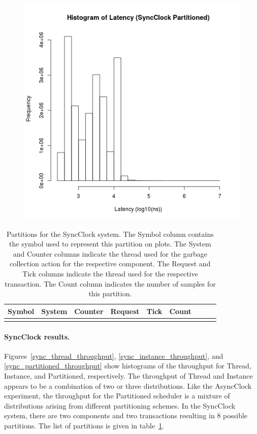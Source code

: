 \begin{figure}
\center
\includegraphics[height=.25\textheight]{sync_partitioned_latency_hist.png}
\caption{\label{sync_partitioned_latency}}
\end{figure}

\clearpage

\begin{longtable}{ccccccccr}
Symbol & System & Counter & Request & Tick & Count \\
\hline
\endhead

\caption{Partitions for the SyncClock system.  The Symbol column contains the symbol used to represent this partition on plots.  The System and Counter columns indicate the thread used for the garbage collection action for the respective component.  The Request and Tick columns indicate the thread used for the respective transaction.  The Count column indicates the number of samples for this partition.}
\label{sync_partitions}
\end{longtable}

\paragraph{SyncClock results.}
Figures~\ref{sync_thread_throughput}, \ref{sync_instance_throughput}, and \ref{sync_partitioned_throughput} show histograms of the throughput for Thread, Instance, and Partitioned, respectively.
The throughput of Thread and Instance appears to be a combination of two or three distributions.
Like the AsyncClock experiment, the throughput for the Partitioned scheduler is a mixture of distributions arising from different partitioning schemes.
In the SyncClock system, there are two components and two transactions resulting in 8 possible partitions.
The list of partitions is given in table~\ref{sync_partitions}.

